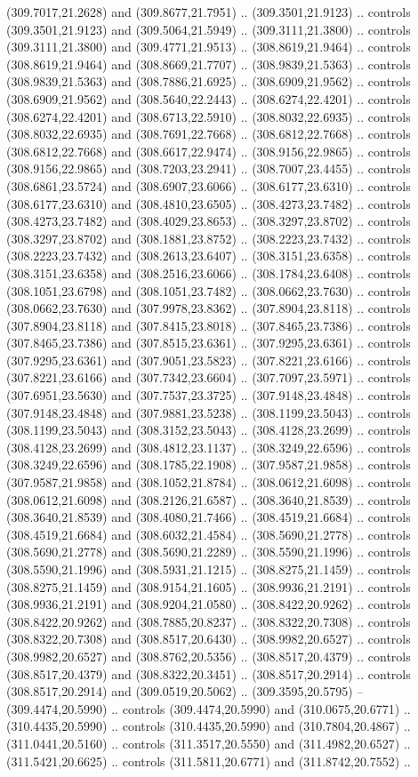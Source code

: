 (309.7017,21.2628) and (309.8677,21.7951) .. (309.3501,21.9123) .. controls (309.3501,21.9123) and (309.5064,21.5949) .. (309.3111,21.3800) .. controls (309.3111,21.3800) and (309.4771,21.9513) .. (308.8619,21.9464) .. controls (308.8619,21.9464) and (308.8669,21.7707) .. (308.9839,21.5363) .. controls (308.9839,21.5363) and (308.7886,21.6925) .. (308.6909,21.9562) .. controls (308.6909,21.9562) and (308.5640,22.2443) .. (308.6274,22.4201) .. controls (308.6274,22.4201) and (308.6713,22.5910) .. (308.8032,22.6935) .. controls (308.8032,22.6935) and (308.7691,22.7668) .. (308.6812,22.7668) .. controls (308.6812,22.7668) and (308.6617,22.9474) .. (308.9156,22.9865) .. controls (308.9156,22.9865) and (308.7203,23.2941) .. (308.7007,23.4455) .. controls (308.6861,23.5724) and (308.6907,23.6066) .. (308.6177,23.6310) .. controls (308.6177,23.6310) and (308.4810,23.6505) .. (308.4273,23.7482) .. controls (308.4273,23.7482) and (308.4029,23.8653) .. (308.3297,23.8702) .. controls (308.3297,23.8702) and (308.1881,23.8752) .. (308.2223,23.7432) .. controls (308.2223,23.7432) and (308.2613,23.6407) .. (308.3151,23.6358) .. controls (308.3151,23.6358) and (308.2516,23.6066) .. (308.1784,23.6408) .. controls (308.1051,23.6798) and (308.1051,23.7482) .. (308.0662,23.7630) .. controls (308.0662,23.7630) and (307.9978,23.8362) .. (307.8904,23.8118) .. controls (307.8904,23.8118) and (307.8415,23.8018) .. (307.8465,23.7386) .. controls (307.8465,23.7386) and (307.8515,23.6361) .. (307.9295,23.6361) .. controls (307.9295,23.6361) and (307.9051,23.5823) .. (307.8221,23.6166) .. controls (307.8221,23.6166) and (307.7342,23.6604) .. (307.7097,23.5971) .. controls (307.6951,23.5630) and (307.7537,23.3725) .. (307.9148,23.4848) .. controls (307.9148,23.4848) and (307.9881,23.5238) .. (308.1199,23.5043) .. controls (308.1199,23.5043) and (308.3152,23.5043) .. (308.4128,23.2699) .. controls (308.4128,23.2699) and (308.4812,23.1137) .. (308.3249,22.6596) .. controls (308.3249,22.6596) and (308.1785,22.1908) .. (307.9587,21.9858) .. controls (307.9587,21.9858) and (308.1052,21.8784) .. (308.0612,21.6098) .. controls (308.0612,21.6098) and (308.2126,21.6587) .. (308.3640,21.8539) .. controls (308.3640,21.8539) and (308.4080,21.7466) .. (308.4519,21.6684) .. controls (308.4519,21.6684) and (308.6032,21.4584) .. (308.5690,21.2778) .. controls (308.5690,21.2778) and (308.5690,21.2289) .. (308.5590,21.1996) .. controls (308.5590,21.1996) and (308.5931,21.1215) .. (308.8275,21.1459) .. controls (308.8275,21.1459) and (308.9154,21.1605) .. (308.9936,21.2191) .. controls (308.9936,21.2191) and (308.9204,21.0580) .. (308.8422,20.9262) .. controls (308.8422,20.9262) and (308.7885,20.8237) .. (308.8322,20.7308) .. controls (308.8322,20.7308) and (308.8517,20.6430) .. (308.9982,20.6527) .. controls (308.9982,20.6527) and (308.8762,20.5356) .. (308.8517,20.4379) .. controls (308.8517,20.4379) and (308.8322,20.3451) .. (308.8517,20.2914) .. controls (308.8517,20.2914) and (309.0519,20.5062) .. (309.3595,20.5795) -- (309.4474,20.5990) .. controls (309.4474,20.5990) and (310.0675,20.6771) .. (310.4435,20.5990) .. controls (310.4435,20.5990) and (310.7804,20.4867) .. (311.0441,20.5160) .. controls (311.3517,20.5550) and (311.4982,20.6527) .. (311.5421,20.6625) .. controls (311.5811,20.6771) and (311.8742,20.7552) .. 